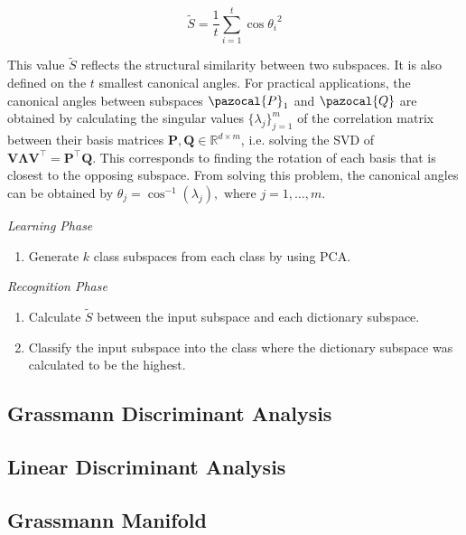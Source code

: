 \[    \tilde{S} = \frac{1}{t} \sum^{t}_{i=1}\cos{\theta_i}^2 \]

This value $\tilde{S}$ reflects the structural similarity between two subspaces. It is also defined on the $t$ smallest canonical angles. For practical applications, the canonical angles between subspaces $\pazocal{P}_1$ and $\pazocal{Q}$ are obtained by calculating the singular values $\{\lambda_j\}_{j=1}^{m}$ of the correlation matrix between their basis matrices $\mathbf{P}, \mathbf{Q} \in \mathbb{R}^{d{\times}m}$, i.e. solving the SVD of $\mathbf{V}\mathbf{\Lambda}\mathbf{V}^{\top} = \mathbf{P}^{\top}\mathbf{Q}$. This corresponds to finding the rotation of each basis that is closest to the opposing subspace. From solving this problem, the canonical angles can be obtained by $\theta_j = \cos^{-1}(\lambda_j), \text{ where } j = 1, \ldots, m$.

{\setlength{\parindent}{0cm} \vspace{5mm}

\emph{Learning Phase}

\begin{enumerate}
    \item Generate $k$ class subspaces from each class by using PCA.
\end{enumerate}

\emph{Recognition Phase}

\begin{enumerate}
    \item Calculate $\tilde{S}$ between the input subspace and each dictionary subspace.
    \item Classify the input subspace into the class where the dictionary subspace was calculated to be the highest.
\end{enumerate}
}
\newpage

\subsection{Grassmann Discriminant Analysis}

\subsection{Linear Discriminant Analysis}

\subsection{Grassmann Manifold}

